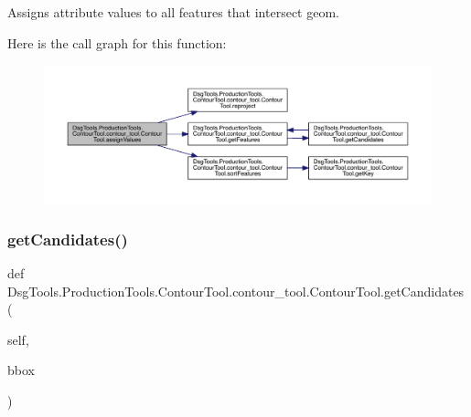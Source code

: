 \begin{DoxyVerb}Assigns attribute values to all features that intersect geom.
\end{DoxyVerb}
 Here is the call graph for this function\+:
\nopagebreak
\begin{figure}[H]
\begin{center}
\leavevmode
\includegraphics[width=350pt]{class_dsg_tools_1_1_production_tools_1_1_contour_tool_1_1contour__tool_1_1_contour_tool_a9e9ea2321b0a802c39e2ea4dcb0ba7de_cgraph}
\end{center}
\end{figure}
\mbox{\label{class_dsg_tools_1_1_production_tools_1_1_contour_tool_1_1contour__tool_1_1_contour_tool_a4bb8cc0232fcfdc145aed0aae3d07630}} 
\subsubsection{\texorpdfstring{get\+Candidates()}{getCandidates()}}
{\footnotesize\ttfamily def Dsg\+Tools.\+Production\+Tools.\+Contour\+Tool.\+contour\+\_\+tool.\+Contour\+Tool.\+get\+Candidates (\begin{DoxyParamCaption}\item[{}]{self,  }\item[{}]{bbox }\end{DoxyParamCaption})}

